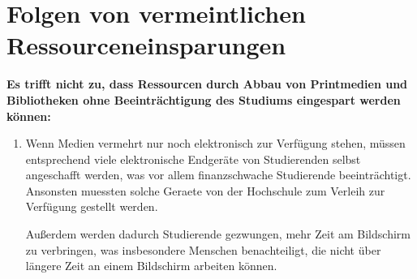 \documentclass[DIV=calc]{scrartcl}
\begin{document}
\section{Folgen von vermeintlichen Ressourceneinsparungen}

\textbf{Es trifft nicht zu, dass Ressourcen durch Abbau von Printmedien und Bibliotheken ohne Beeinträchtigung des Studiums eingespart werden können:}

\begin{enumerate}
\item Wenn Medien vermehrt nur noch elektronisch zur Verfügung stehen, m\"ussen entsprechend viele elektronische Endgeräte von Studierenden selbst angeschafft werden, was vor allem finanzschwache Studierende beeinträchtigt.
Ansonsten muessten solche Geraete von der Hochschule zum Verleih zur Verf\"ugung gestellt werden.

Außerdem werden dadurch Studierende gezwungen, mehr Zeit am Bildschirm zu verbringen, was insbesondere Menschen benachteiligt, die nicht über längere Zeit an einem Bildschirm arbeiten können.



\end{enumerate}
\end{document}
